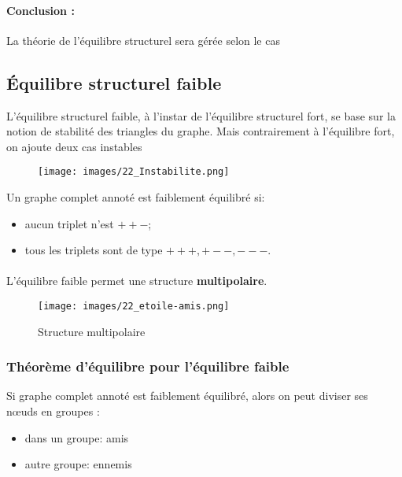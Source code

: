 \paragraph{Conclusion :}La théorie de l'équilibre structurel sera gérée selon le cas




\subsection{Équilibre structurel faible}
L'équilibre structurel faible, à l'instar de l'équilibre structurel fort, se base sur la
notion de stabilité des triangles du graphe. Mais contrairement à l'équilibre fort, on ajoute deux cas instables   

\begin{figure}[!h]
	\centering
	\texttt{[image: images/22\_Instabilite.png]}
\end{figure}

Un graphe complet annoté est faiblement équilibré si:
\begin{itemize}
\item aucun triplet n'est $++-$;
\item tous les triplets sont de type $+++, +--, ---$. 
\end{itemize}
\paragraph{}
L'équilibre faible permet une structure \textbf{multipolaire}.

\begin{figure}[h!]
	\centering
	\texttt{[image: images/22\_etoile-amis.png]}
	\label{fig:multipolaire}
	\caption{Structure multipolaire}
\end{figure}



\subsubsection*{Théorème d'équilibre pour l'équilibre faible}

Si graphe complet annoté est faiblement équilibré, alors on peut diviser ses nœuds en groupes :

\begin{itemize}


\item dans un groupe: amis

\item autre groupe: ennemis

\end{itemize}

